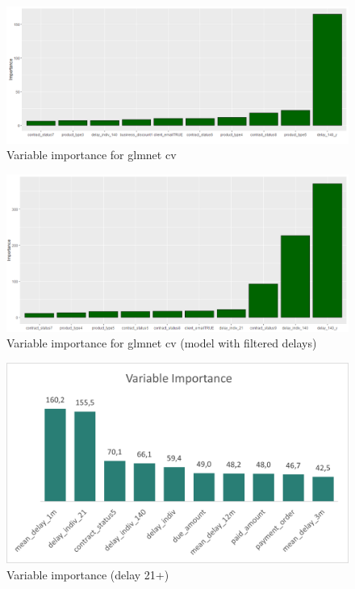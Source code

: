 \documentclass[
]{article}
\begin{document}
\begin{figure}
\includegraphics[width=0.9\linewidth]{delay_varImp} \caption{\label{fig:varIm}Variable importance for glmnet cv}\label{fig:varIm}
\end{figure}

\begin{figure}
\includegraphics[width=0.9\linewidth]{delay_varImp_filter21} \caption{\label{fig:varIm}Variable importance for glmnet cv (model with filtered delays)}\label{fig:varImFilter}
\end{figure}

\begin{figure}
\includegraphics[width=0.9\linewidth]{varimp21} \caption{\label{fig:varIm21}Variable importance  (delay 21+)}\label{fig:varIm21}
\end{figure}
\end{document}
